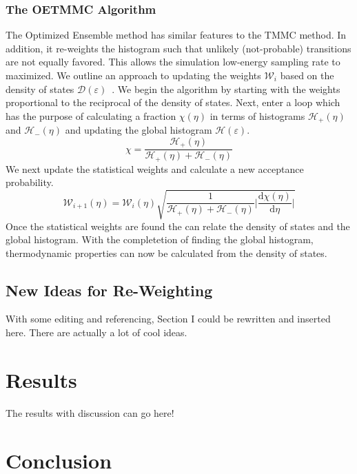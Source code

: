 \documentclass[letterpaper,twocolumn,amsmath,amssymb,pre,aps,10pt]{revtex4-1}
\begin{document}
\subsubsection{The OETMMC Algorithm}

The Optimized Ensemble method has similar features to the TMMC method.  In  addition, it re-weights the histogram such that unlikely (not-probable) transitions are not equally favored.  This allows the simulation low-energy sampling rate to maximized.  We outline an approach to updating the weights $\mathcal{W}_{i}$ based on the density of states $\mathcal{D}(\varepsilon)$~\cite{trebst2004optimizing,wessel2007optimized}.  We begin the algorithm by starting with the weights proportional to the reciprocal of the density of states.  Next, enter a loop which has the purpose of calculating a fraction
$\chi(\eta)$ in terms of histograms $\mathcal{H}_{+}(\eta)$ and $\mathcal{H}_{-}(\eta)$ and updating the
global histogram $\mathcal{H}(\varepsilon)$.
\begin{equation}
	\chi = \frac{\mathcal{H}_{+}(\eta)}{\mathcal{H}_{+}(\eta)+\mathcal{H}_{-}(\eta)}
\end{equation}
We next update the statistical weights and calculate a new acceptance probability.
\begin{equation}
	\mathcal{W}_{i+1}(\eta) = \mathcal{W}_{i}(\eta)\sqrt{\frac{1}{\mathcal{H}_{+}(\eta)+
	\mathcal{H}_{-}(\eta)}\bigg|\frac{\text{d}\chi(\eta)}{\text{d}\eta}\bigg|} 
\end{equation}
Once the statistical weights are found the can relate the density of states and the 
global histogram. With the completetion of finding the global histogram, thermodynamic
properties can now be calculated from the density of states.

\subsection{New Ideas for Re-Weighting}

With some editing and referencing, Section I could be rewritten and inserted here.
There are actually a lot of cool ideas.

\section{Results}

The results with discussion can go here!

\section{Conclusion}
\end{document}
